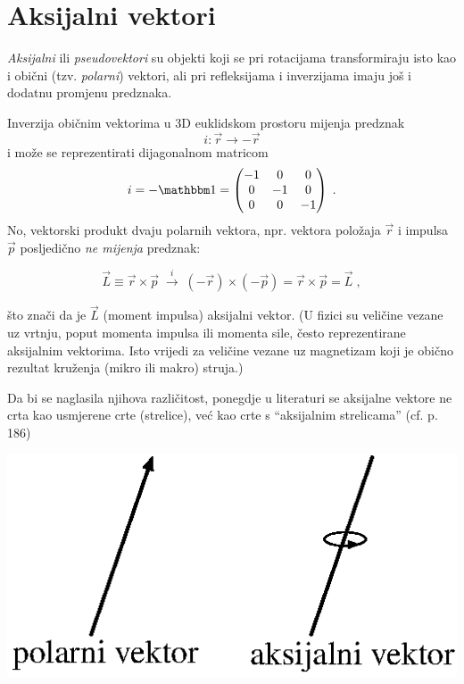 \chapter{Aksijalni vektori}
\label{sec:aksijalni}

\emph{Aksijalni} ili \emph{pseudovektori} su objekti koji se pri rotacijama transformiraju
isto kao i obični (tzv. \emph{polarni}) vektori, ali pri refleksijama i inverzijama
imaju još i dodatnu promjenu predznaka.

Inverzija običnim vektorima u 3D euklidskom prostoru mijenja
predznak 
$$i: \vec{r} \to - \vec{r}$$ 
i može se reprezentirati dijagonalnom
matricom 
$$
i = -\Eins = 
\begin{pmatrix}
    -1 & 0 & 0 \\
    0 & -1 & 0 \\
    0 & 0 & -1
\end{pmatrix} \;.
$$
No, vektorski produkt dvaju polarnih vektora, npr. vektora položaja $\vec{r}$
i impulsa $\vec{p}$ posljedično \emph{ne mijenja} predznak:

\[  \vec{L}\equiv \vec{r}\times\vec{p} \; \stackrel{i}{\longrightarrow} \;
  (-\vec{r}) \times (-\vec{p}) =  \vec{r}\times\vec{p} = \vec{L}  \;,
\]

što znači da je $\vec{L}$ (moment impulsa) aksijalni vektor. (U fizici su
veličine vezane uz vrtnju, poput momenta impulsa ili momenta sile, 
često reprezentirane aksijalnim vektorima. Isto vrijedi za veličine
vezane uz magnetizam koji je obično rezultat kruženja (mikro ili makro) struja.)

Da bi se naglasila njihova različitost,
ponegdje u literaturi se aksijalne vektore ne crta kao usmjerene crte
(strelice), već kao crte s ``aksijalnim strelicama'' (cf. 
\cite{Bronstejn:2004} p. 186)

\centerline{\includegraphics[scale=0.8]{pics/aksijalni_vektor.eps}}

